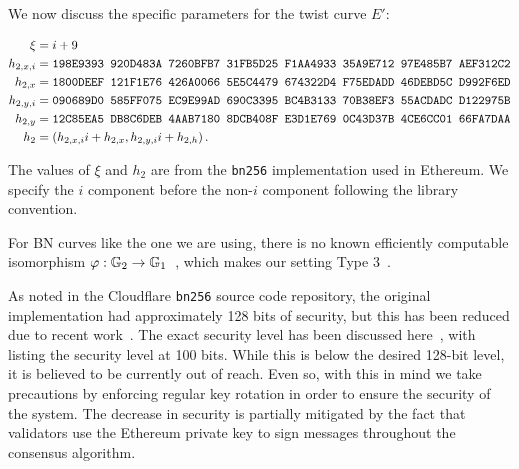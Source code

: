 We now discuss the specific parameters for the twist curve $E'$:

\begin{align}
    \xi &= i + 9 \nonumber\\
    h_{2,x,i} &= \texttt{198E9393 920D483A 7260BFB7 31FB5D25 F1AA4933 35A9E712 97E485B7 AEF312C2} \nonumber\\
    h_{2,x} &= \texttt{1800DEEF 121F1E76 426A0066 5E5C4479 674322D4 F75EDADD 46DEBD5C D992F6ED} \nonumber\\
    h_{2,y,i} &= \texttt{090689D0 585FF075 EC9E99AD 690C3395 BC4B3133 70B38EF3 55ACDADC D122975B} \nonumber\\
    h_{2,y} &= \texttt{12C85EA5 DB8C6DEB 4AAB7180 8DCB408F E3D1E769 0C43D37B 4CE6CC01 66FA7DAA} \nonumber\\
    h_{2} &= \left( h_{2,x,i}i + h_{2,x}, h_{2,y,i}i + h_{2,h} \right).
\end{align}

\noindent
The values of $\xi$ and $h_{2}$ are from the \texttt{bn256}
implementation used in Ethereum.
We specify the $i$ component before the non-$i$ component
following the library convention.

For BN curves like the one we are using, there is no known
efficiently computable isomorphism
$\varphi:\mathbb{G}_{2}\to\mathbb{G}_{1}$~\cite[Chap 2.2.7]{rass2013cryptography},
which makes our setting Type 3~\cite{EfficienySecurity2010}.

As noted in the Cloudflare \texttt{bn256} source code repository,
the original implementation had approximately 128 bits of security,
but this has been reduced due to recent work~\cite{exTNFS}.
The exact security level has been discussed
here~\cite{MSSsecurity,BDkeysizes}, with~\cite{BDkeysizes} listing the
security level at 100 bits.
While this is below the desired 128-bit level, it is believed
to be currently out of reach.
Even so, with this in mind we take precautions by enforcing
regular key rotation in order to ensure the security of the system.
The decrease in security is partially mitigated by the fact that
validators use the Ethereum private key to sign messages
throughout the consensus algorithm.
